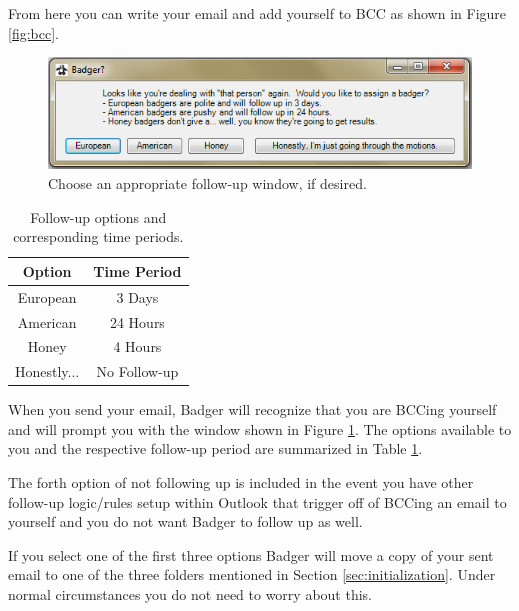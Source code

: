 \documentclass[12pt]{article}
\begin{document}
From here you can write your email and add yourself to BCC as shown in Figure \ref{fig:bcc}.

\begin{figure}
    \centering
    \includegraphics[width=\textwidth]{badger-options}
    \caption{Choose an appropriate follow-up window, if desired.}
    \label{fig:badger-options}
\end{figure}

\begin{table}
    \begin{center}
        \begin{tabular}{ | c | c | }
            \hline
            \textbf{Option} & \textbf{Time Period} \\ \hline
            European & 3 Days \\ \hline
            American & 24 Hours \\ \hline
            Honey & 4 Hours \\ \hline
            Honestly... & No Follow-up \\ \hline
        \end{tabular}
        \caption{Follow-up options and corresponding time periods.}
        \label{tbl:badger-options}
    \end{center}
\end{table}

When you send your email, Badger will recognize that you are BCCing yourself and will prompt you with the window shown in Figure \ref{fig:badger-options}. The options available to you and the respective follow-up period are summarized in Table \ref{tbl:badger-options}.

The forth option of not following up is included in the event you have other follow-up logic/rules setup within Outlook that trigger off of BCCing an email to yourself and you do not want Badger to follow up as well.

If you select one of the first three options Badger will move a copy of your sent email to one of the three folders mentioned in Section \ref{sec:initialization}.  Under normal circumstances you do not need to worry about this.
\end{document}
